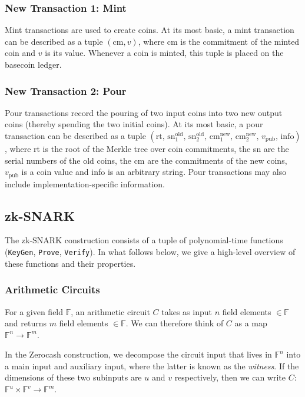 \documentclass{article}
\begin{document}
\subsubsection{New Transaction 1: Mint}
Mint transactions are used to create coins. At its most basic, a mint transaction can be described as a tuple $(\text{cm}, v)$, where $\text{cm}$ is the commitment of the minted coin and $v$ is its value. Whenever a coin is minted, this tuple is placed on the basecoin ledger.

\subsubsection{New Transaction 2: Pour}
Pour transactions record the pouring of two input coins into two new output coins (thereby spending the two initial coins). At its most basic, a pour transaction can be described as a tuple $(\text{rt}, \, {\text{sn}}^{\text{old}}_1, \, {\text{sn}}^{\text{old}}_2, \, {\text{cm}}^{\text{new}}_1, \, {\text{cm}}^{\text{new}}_2, \, v_{\text{pub}}, \, \text{info})$, where rt is the root of the Merkle tree over coin commitments, the sn are the serial numbers of the old coins, the cm are the commitments of the new coins, $v_{\text{pub}}$ is a coin value and info is an arbitrary string. Pour transactions may also include implementation-specific information.

\subsection{zk-SNARK}
The zk-SNARK construction consists of a tuple of polynomial-time functions (\texttt{KeyGen}, \texttt{Prove}, \texttt{Verify}). In what follows below, we give a high-level overview of these functions and their properties.

\subsubsection{Arithmetic Circuits}
For a given field $\mathbb{F}$, an arithmetic circuit $C$ takes as input $n$ field elements $\in \mathbb{F}$ and returns $m$ field elements $\in \mathbb{F}$. We can therefore think of $C$ as a map $\mathbb{F}^n \longrightarrow \mathbb{F}^m$.

In the Zerocash construction, we decompose the circuit input that lives in $\mathbb{F}^n$ into a main input and auxiliary input, where the latter is known as the \emph{witness}. If the dimensions of these two subinputs are $u$ and $v$ respectively, then we can write $C$: $\mathbb{F}^u \times \mathbb{F}^v \longrightarrow \mathbb{F}^m$.
\end{document}
